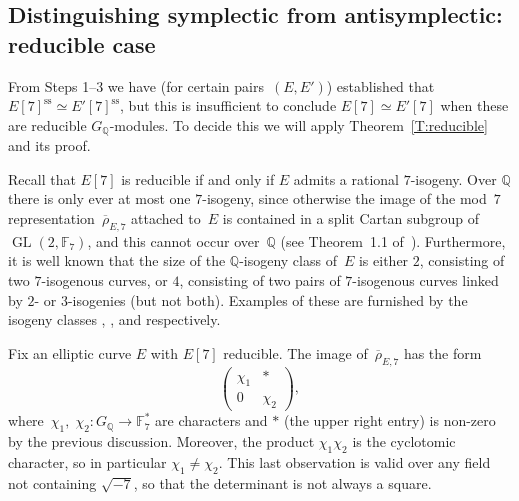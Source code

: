 \documentclass[twoside,leqno,symbols-for-thanks, draft]{rmi}
\numberwithin{equation}{section}
\newcommand{\lmfdbeciso}[2]{\href{http://www.lmfdb.org/EllipticCurve/Q/#1/#2}{\text{\rm#1#2}}}
\newcommand{\F}{\mathbb{F}}
\newcommand{\Q}{\mathbb{Q}}
\newcommand{\rhobar}{{\overline{\rho}}}
\DeclareMathOperator{\sss}{ss}
\newcommand{\GL}{\operatorname{GL}}
\theoremstyle{remark}
\begin{document}
\subsection{Distinguishing symplectic from antisymplectic: reducible
  case}

From Steps 1--3 we have (for certain pairs~$(E,E')$) established that
$E[7]^{\sss} \simeq E'[7]^{\sss}$, but this is insufficient to conclude
$E[7] \simeq E'[7]$ when these are reducible $G_\Q$-modules.  To
decide this we will apply Theorem~\ref{T:reducible} and its proof.

Recall that $E[7]$ is reducible if and only if $E$ admits a rational
$7$-isogeny.  Over $\Q$ there is only ever at most one $7$-isogeny,
since otherwise the image of the mod~$7$
representation~$\rhobar_{E,7}$ attached to~$E$ is contained in a split
Cartan subgroup of $\GL(2,\F_7)$, and this cannot occur over~$\Q$
(see Theorem~1.1 of~\cite{GL}).  Furthermore, it is well known that the
size of the $\Q$-isogeny class of~$E$ is either $2$, consisting of two
$7$-isogenous curves, or $4$, consisting of two pairs of $7$-isogenous
curves linked by $2$-{} or $3$-isogenies (but not both). Examples of
these are furnished by the isogeny classes \lmfdbeciso{26}{b},
\lmfdbeciso{49}{a}, and \lmfdbeciso{162}{b} respectively.

Fix an elliptic curve $E$ with $E[7]$ reducible. 
The image
of~$\rhobar_{E,7}$ has the form
\[
  \begin{pmatrix}\chi_1&*\\0&\chi_2  \end{pmatrix},
\]
where~$\chi_1, \; \chi_2 : G_{\Q}\to\F_7^*$ are characters and $*$
(the upper right entry) is non-zero by the previous
discussion. Moreover, the product $\chi_1\chi_2$ is the cyclotomic
character, so in particular $\chi_1\not=\chi_2$. This last observation
is valid over any field not containing $\sqrt{-7}$, so that the
determinant is not always a square.
\end{document}
